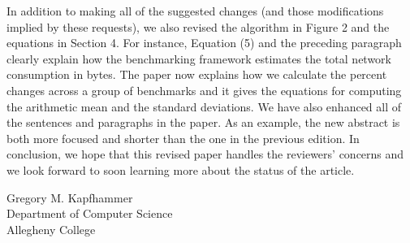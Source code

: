 \documentclass[11pt]{article}
\begin{document}
\vspace*{-.15in}

In addition to making all of the suggested changes (and those
modifications implied by these requests), we also revised the
algorithm in Figure 2 and the equations in Section 4.  For instance,
Equation (5) and the preceding paragraph clearly explain how the
benchmarking framework estimates the total network consumption in
bytes.  The paper now explains how we calculate the percent changes
across a group of benchmarks and it gives the equations for computing
the arithmetic mean and the standard deviations.  We have also
enhanced all of the sentences and paragraphs in the paper.  As an
example, the new abstract is both more focused and shorter than the
one in the previous edition.  In conclusion, we hope that this
revised paper handles the reviewers' concerns and we look forward to
soon learning more about the status of the article.

\vspace*{.15in}
\noindent
Gregory M. Kapfhammer \\
Department of Computer Science \\
Allegheny  College 
\end{document}
